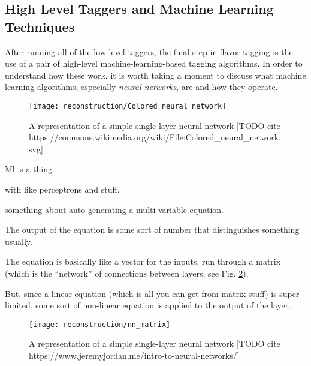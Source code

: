         \FloatBarrier
        \subsection{High Level Taggers and Machine Learning Techniques}

            After running all of the low level taggers,
                the final step in flavor tagging is the use of a pair of high-level machine-learning-based tagging algorithms.
            In order to understand how these work, it is worth taking a moment to discuss what machine learning algorithms,
                especially \textit{neural networks}, are and how they operate.

            \begin{figure}[tbh] \center
                \texttt{[image: reconstruction/Colored\_neural\_network]}
                \caption{
                    A representation of a simple single-layer neural network
                    [TODO cite https://commons.wikimedia.org/wiki/File:Colored\_neural\_network.svg]
                }
                \label{fig:colored_neural_network}
            \end{figure}

            \cite{MLatLHC}

            Ml is a thing.

            with like perceptrons and stuff.

            something about auto-generating a multi-variable equation.

            The output of the equation is some sort of number that distinguishes something usually.

            The equation is basically like a vector for the inputs, run through a matrix
                (which is the ``network'' of connections between layers, see Fig. \ref{fig:nn_matrix}).
            
            But, since a linear equation (which is all you can get from matrix stuff) is super limited,
                some sort of non-linear equation is applied to the output of the layer.


            \begin{figure}[tbh] \center
                \texttt{[image: reconstruction/nn\_matrix]}
                \caption{
                    A representation of a simple single-layer neural network
                    [TODO cite https://www.jeremyjordan.me/intro-to-neural-networks/]
                }
                \label{fig:nn_matrix}
            \end{figure}




